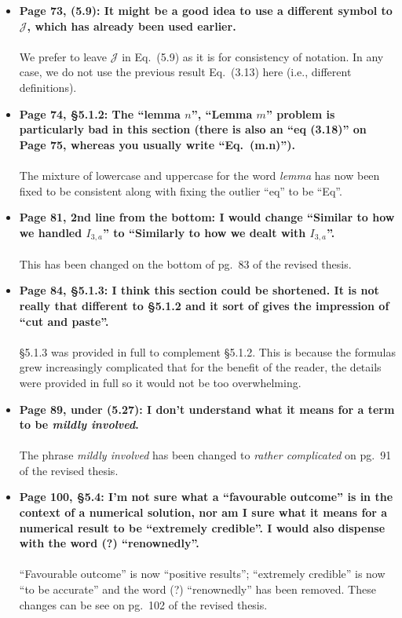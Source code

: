 \documentclass{article}
\begin{document}
\begin{enumerate}
\begin{itemize}
			\item{\textbf{Page 73, (5.9): It might be a good idea to use a different symbol to $\mathscr{J}$, which has already been used earlier.
			\\\\}}
			We prefer to leave $\mathscr{J}$ in Eq.~(5.9) as it is for consistency of notation. In any case, we do not use the previous result Eq.~(3.13) here (i.e., different definitions).
			
			\item{\textbf{Page 74, \S5.1.2:  The ``lemma $n$'', ``Lemma $m$'' problem is particularly bad in this section (there is also an ``eq (3.18)'' on Page 75, whereas you usually write ``Eq.~(m.n)'').
			\\\\}}
			The mixture of lowercase and uppercase for the word \emph{lemma} has now been fixed to be consistent along with fixing the outlier ``eq'' to be ``Eq''.
			
			\item{\textbf{Page 81, 2nd line from the bottom:  I would change ``Similar to how we handled $I_{3,a}$'' to ``Similarly to how we dealt with $I_{3,a}$''.
			\\\\}}
			This has been changed on the bottom of pg.~83 of the revised thesis.
			
			\item{\textbf{Page 84, \S5.1.3: I think this section could be shortened. It is not really that different to \S5.1.2 and it sort of gives the impression of ``cut and paste''.
			\\\\}}
			\S5.1.3 was provided in full to complement \S5.1.2. This is because the formulas grew increasingly complicated that for the benefit of the reader, the details were provided in full so it would not be too overwhelming.
			
			\item{\textbf{Page 89, under (5.27): I don't understand what it means for a term to be \emph{mildly involved}.
			\\\\}}
			The phrase \emph{mildly involved} has been changed to \emph{rather complicated} on pg.~91 of the revised thesis.
			\item{\textbf{Page 100, \S5.4: I'm not sure what a ``favourable outcome'' is in the context of a numerical solution, nor am I sure what it means for a numerical result to be ``extremely credible''. I would also dispense with the word (?) ``renownedly''.
			\\\\}}
			``Favourable outcome'' is now ``positive results''; ``extremely credible'' is now ``to be accurate'' and the word (?) ``renownedly'' has been removed. These changes can be see on pg.~102 of the revised thesis.
			

\end{itemize}
\end{enumerate}
\end{document}
